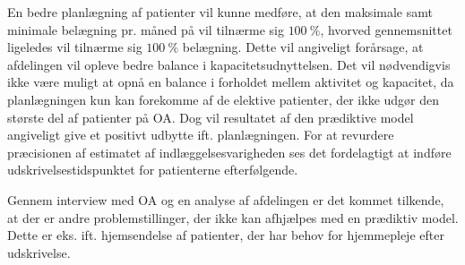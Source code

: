 En bedre planlægning af patienter vil kunne medføre, at den maksimale samt minimale belægning pr. måned på  vil tilnærme sig $100~\%$, hvorved gennemsnittet ligeledes vil tilnærme sig $100~\%$ belægning. Dette vil angiveligt forårsage, at afdelingen vil opleve bedre balance i kapacitetsudnyttelsen. Det vil nødvendigvis ikke være muligt at opnå en balance i forholdet mellem aktivitet og kapacitet, da planlægningen kun kan forekomme af de elektive patienter, der ikke udgør den største del af patienter på OA. 
Dog vil resultatet af den prædiktive model angiveligt give et positivt udbytte ift. planlægningen. For at revurdere præcisionen af estimatet af indlæggelsesvarigheden ses det fordelagtigt at indføre udskrivelsestidspunktet for patienterne efterfølgende.

Gennem interview med OA og en analyse af afdelingen er det kommet tilkende, at der er andre problemstillinger, der ikke kan afhjælpes med en prædiktiv model. Dette er eks. ift. hjemsendelse af patienter, der har behov for hjemmepleje efter udskrivelse.
